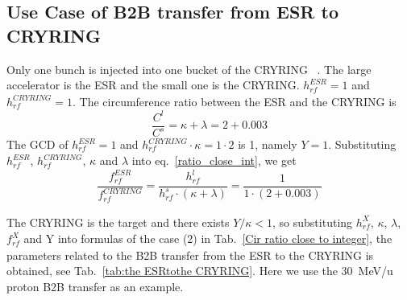 \subsection{Use Case of B2B transfer from ESR to CRYRING}
Only one bunch is injected into one bucket of the CRYRING ~\cite{herfurth_low_2013, lestinsky_cryring_2015}. The large accelerator is the ESR and the small one is the CRYRING. $h^{\mathit{ESR}}_\mathit{rf}=1$ and $h^{\mathit{CRYRING}}_\mathit{rf}=1$. The circumference ratio between the ESR and the CRYRING is
\begin{equation}
\frac{C^l}{C^s}=\kappa + \lambda =2+0.003
\end{equation}
The GCD of $h^{\mathit{ESR}}_\mathit{rf}=1$ and $h^{\mathit{CRYRING}}_\mathit{rf} \cdot \kappa=1\cdot 2$ is 1, namely $Y=1$. Substituting $h^{\mathit{ESR}}_\mathit{rf}$, $h^{\mathit{CRYRING}}_\mathit{rf}$, $\kappa$ and $\lambda$ into eq.~\ref{ratio_close_int}, we get
\begin{equation}
\frac {f_{\mathit{rf}}^{\mathit{ESR}}}{f_{\mathit{rf}}^{\mathit{CRYRING}}}= \frac{h^l_\mathit{rf}}{h^s_\mathit{rf} \cdot (\kappa+ \lambda)}=\frac {1}{1 \cdot(2+0.003)}
\end{equation}

The CRYRING is the target and there exists $Y/\kappa<1$, so substituting $h^X_\mathit{rf}$, $\kappa$, $\lambda$, $f_{\mathit{rf}}^{X}$ and Y into formulas of the case (2) in Tab.~\ref{Cir ratio close to integer}, the parameters related to the B2B transfer from the ESR to the CRYRING is obtained, see Tab.~\ref{tab:the ESRtothe CRYRING}. Here we use the \SI{30}{MeV/\atomicmassunit} proton B2B transfer as an example. 


